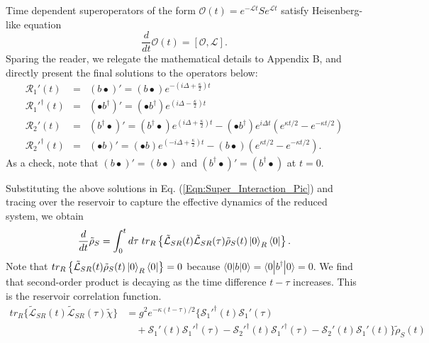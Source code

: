  Time dependent superoperators of the form $\mathcal{O}(t) = e^{- \mathcal{L} t } S e^{\mathcal{L} t }$ satisfy Heisenberg-like equation
\begin{equation}
\frac{d }{d t} \mathcal{O}(t) = [ \mathcal{O} , \mathcal{L} ].
\end{equation}
Sparing the reader, we relegate the mathematical details to Appendix B, and directly present the final solutions to the operators below:
\begin{eqnarray}
\mathcal{R}_1'(t) &=& \left( b \bullet \right)' =  \left( b \bullet \right) e^{- \left( i \Delta + \frac{\kappa }{2} \right) t } \nonumber \\
\mathcal{R}_1'^{\dagger} (t) & = & \left( \bullet b^{\dagger} \right)' = \left( \bullet b^{\dagger} \right) e^{\left( i \Delta - \frac{\kappa}{2} \right) t} \nonumber \\
\mathcal{R}_2'(t) & = & \left( b^{\dagger} \bullet \right)' = \left( b^{\dagger} \bullet \right) e^{(i \Delta + \frac{\kappa}{2})t} - \left( \bullet b^{\dagger} \right) e^{i \Delta t}\left( e^{\kappa t / 2} - e^{- \kappa t / 2 } \right) \nonumber \\
\mathcal{R}_2'^{\dagger}(t) & = & \left( \bullet b \right)' = \left( \bullet b \right) e^{ \left( - i \Delta + \frac{\kappa}{2} \right) t} - \left( b \bullet \right) \left( e^{\kappa t / 2} - e^{- \kappa t / 2 } \right).
\end{eqnarray}
As a check, note that $\left( b \bullet \right)' = ( b \bullet )$ and $\left( b^\dagger \bullet \right)' = ( b^\dagger \bullet )$ at $t=0$.
%
\par%
Substituting the above solutions in Eq. (\ref{Eqn:Super_Interaction_Pic}) and tracing over the reservoir to capture the effective dynamics of the reduced system, we obtain 
\begin{equation}
\frac{d}{d t} \tilde{\rho}_S =   \int_0^t d\tau \; tr_R \left\lbrace \mathcal{\tilde{L}}_{SR}(t) \mathcal{\tilde{L}}_{SR}(\tau) \tilde{\rho}_S(t) \left| 0 \right\rangle_R \left\langle 0 \right| \right\rbrace.
\end{equation}
Note that $tr_R \left\lbrace \mathcal{\tilde{L}}_{SR}(t) \tilde{\rho}_S(t) \left| 0 \right\rangle_R \left\langle 0 \right| \right\rbrace=0$
because $\langle 0 | b | 0 \rangle = \langle 0 | b^{\dagger} | 0 \rangle = 0$.
We find that second-order product is decaying as the time difference $t-\tau$ increases. This is the reservoir correlation function.
\begin{align}\label{decay expodential}
tr_R \lbrace \mathcal{\tilde{L}}_{SR}(t) \mathcal{\tilde{L}}_{SR}(\tau) \tilde{\chi} \rbrace & =  g^2 e^{ - \kappa ( t - \tau )/ 2 } \lbrace \mathcal{S}_1'^{\dagger}(t) \mathcal{S}_1'(\tau) \nonumber \\
& \quad +  \mathcal{S}_1'(t) \mathcal{S}_1'^{\dagger}(\tau) - \mathcal{S}_2'^{\dagger}(t) \mathcal{S}_1'^{\dagger}(\tau) - \mathcal{S}_2'(t) \mathcal{S}_1'(t) \rbrace \tilde{\rho}_S(t) \nonumber \\
\end{align}
